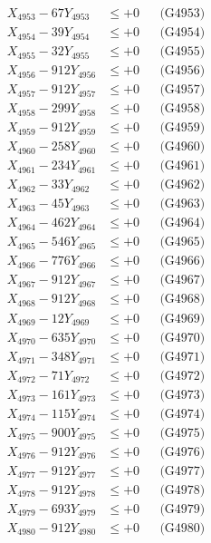 \documentclass[a4paper,10pt]{article}
\begin{document}
{\begin{align}
X_{4953} - 67Y_{4953} &\leq +0 && \text{(G4953)} \\
X_{4954} - 39Y_{4954} &\leq +0 && \text{(G4954)} \\
X_{4955} - 32Y_{4955} &\leq +0 && \text{(G4955)} \\
X_{4956} - 912Y_{4956} &\leq +0 && \text{(G4956)} \\
X_{4957} - 912Y_{4957} &\leq +0 && \text{(G4957)} \\
X_{4958} - 299Y_{4958} &\leq +0 && \text{(G4958)} \\
X_{4959} - 912Y_{4959} &\leq +0 && \text{(G4959)} \\
X_{4960} - 258Y_{4960} &\leq +0 && \text{(G4960)} \\
\allowbreak
X_{4961} - 234Y_{4961} &\leq +0 && \text{(G4961)} \\
X_{4962} - 33Y_{4962} &\leq +0 && \text{(G4962)} \\
X_{4963} - 45Y_{4963} &\leq +0 && \text{(G4963)} \\
X_{4964} - 462Y_{4964} &\leq +0 && \text{(G4964)} \\
X_{4965} - 546Y_{4965} &\leq +0 && \text{(G4965)} \\
X_{4966} - 776Y_{4966} &\leq +0 && \text{(G4966)} \\
X_{4967} - 912Y_{4967} &\leq +0 && \text{(G4967)} \\
X_{4968} - 912Y_{4968} &\leq +0 && \text{(G4968)} \\
X_{4969} - 12Y_{4969} &\leq +0 && \text{(G4969)} \\
X_{4970} - 635Y_{4970} &\leq +0 && \text{(G4970)} \\
\allowbreak
X_{4971} - 348Y_{4971} &\leq +0 && \text{(G4971)} \\
X_{4972} - 71Y_{4972} &\leq +0 && \text{(G4972)} \\
X_{4973} - 161Y_{4973} &\leq +0 && \text{(G4973)} \\
X_{4974} - 115Y_{4974} &\leq +0 && \text{(G4974)} \\
X_{4975} - 900Y_{4975} &\leq +0 && \text{(G4975)} \\
X_{4976} - 912Y_{4976} &\leq +0 && \text{(G4976)} \\
X_{4977} - 912Y_{4977} &\leq +0 && \text{(G4977)} \\
X_{4978} - 912Y_{4978} &\leq +0 && \text{(G4978)} \\
X_{4979} - 693Y_{4979} &\leq +0 && \text{(G4979)} \\
X_{4980} - 912Y_{4980} &\leq +0 && \text{(G4980)} \\

\end{align}}
\end{document}
